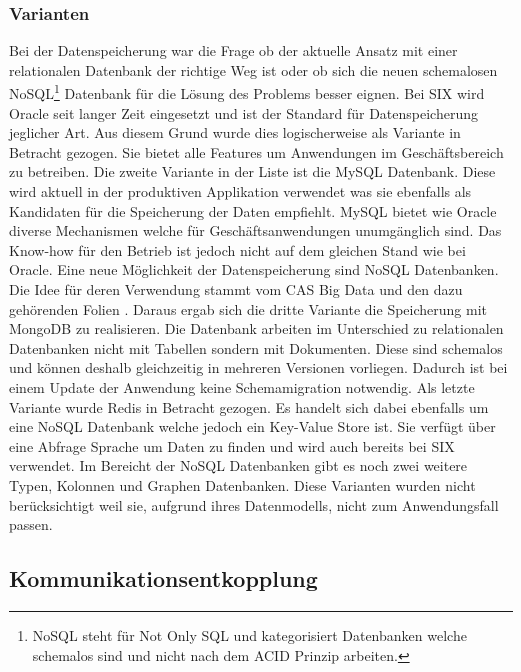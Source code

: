 \subsubsection{Varianten}
Bei der Datenspeicherung war die Frage ob der aktuelle Ansatz mit einer relationalen Datenbank der richtige Weg ist oder ob sich die neuen schemalosen NoSQL\footnote{NoSQL steht für Not Only SQL und kategorisiert Datenbanken welche schemalos sind und nicht nach dem ACID Prinzip arbeiten.} Datenbank für die Lösung des Problems besser eignen.\newline
Bei SIX wird Oracle seit langer Zeit eingesetzt und ist der Standard für Datenspeicherung jeglicher Art. Aus diesem Grund wurde dies logischerweise als Variante in Betracht gezogen. Sie bietet alle Features um Anwendungen im Geschäftsbereich zu betreiben.\newline
Die zweite Variante in der Liste ist die MySQL Datenbank. Diese wird aktuell in der produktiven Applikation verwendet was sie ebenfalls als Kandidaten für die Speicherung der Daten empfiehlt.
MySQL bietet wie Oracle diverse Mechanismen welche für Geschäftsanwendungen unumgänglich sind. Das Know-how für den Betrieb ist jedoch nicht auf dem gleichen Stand wie bei Oracle.\newline
Eine neue Möglichkeit der Datenspeicherung sind NoSQL Datenbanken. Die Idee für deren Verwendung stammt vom CAS Big Data und den dazu gehörenden Folien \cite{nosqlintro}. Daraus ergab sich die dritte Variante die Speicherung mit MongoDB zu realisieren. Die Datenbank arbeiten im Unterschied zu relationalen Datenbanken nicht mit Tabellen sondern mit Dokumenten. Diese sind schemalos und können deshalb gleichzeitig in mehreren Versionen vorliegen. Dadurch ist bei einem Update der Anwendung keine Schemamigration notwendig.\newline
Als letzte Variante wurde Redis in Betracht gezogen. Es handelt sich dabei ebenfalls um eine NoSQL Datenbank welche jedoch ein Key-Value Store ist. Sie verfügt über eine Abfrage Sprache um Daten zu finden und wird auch bereits bei SIX verwendet. Im Bereicht der NoSQL Datenbanken gibt es noch zwei weitere Typen, Kolonnen und Graphen Datenbanken. Diese Varianten wurden nicht berücksichtigt weil sie, aufgrund ihres Datenmodells, nicht zum Anwendungsfall passen.

\subsection{Kommunikationsentkopplung}

